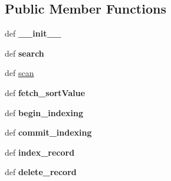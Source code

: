 \subsection*{Public Member Functions}
\begin{DoxyCompactItemize}
\item 
\hypertarget{classcheshire3_1_1index_1_1_pass_through_index_a07cbd7510cd038f0d2a7577a862dd393}{def {\bfseries \-\_\-\-\_\-init\-\_\-\-\_\-}}\label{classcheshire3_1_1index_1_1_pass_through_index_a07cbd7510cd038f0d2a7577a862dd393}

\item 
\hypertarget{classcheshire3_1_1index_1_1_pass_through_index_af2b95a1f17d4d0476f3502b6cd51227f}{def {\bfseries search}}\label{classcheshire3_1_1index_1_1_pass_through_index_af2b95a1f17d4d0476f3502b6cd51227f}

\item 
def \hyperlink{classcheshire3_1_1index_1_1_pass_through_index_a122456e838b904d359bf48e23abf5e8a}{scan}
\item 
\hypertarget{classcheshire3_1_1index_1_1_pass_through_index_a9803ad4733e0b1ada781bdbd46a5ef95}{def {\bfseries fetch\-\_\-sort\-Value}}\label{classcheshire3_1_1index_1_1_pass_through_index_a9803ad4733e0b1ada781bdbd46a5ef95}

\item 
\hypertarget{classcheshire3_1_1index_1_1_pass_through_index_ab7c7cf31217ffd04e68a39e3507acd27}{def {\bfseries begin\-\_\-indexing}}\label{classcheshire3_1_1index_1_1_pass_through_index_ab7c7cf31217ffd04e68a39e3507acd27}

\item 
\hypertarget{classcheshire3_1_1index_1_1_pass_through_index_a834017cc204e9fac871a4f3e793a01ea}{def {\bfseries commit\-\_\-indexing}}\label{classcheshire3_1_1index_1_1_pass_through_index_a834017cc204e9fac871a4f3e793a01ea}

\item 
\hypertarget{classcheshire3_1_1index_1_1_pass_through_index_ae0efe721aef1e1c400cd49fa302a6122}{def {\bfseries index\-\_\-record}}\label{classcheshire3_1_1index_1_1_pass_through_index_ae0efe721aef1e1c400cd49fa302a6122}

\item 
\hypertarget{classcheshire3_1_1index_1_1_pass_through_index_ad49f73782deb36ce73d0ddd101cba857}{def {\bfseries delete\-\_\-record}}\label{classcheshire3_1_1index_1_1_pass_through_index_ad49f73782deb36ce73d0ddd101cba857}

\end{DoxyCompactItemize}
